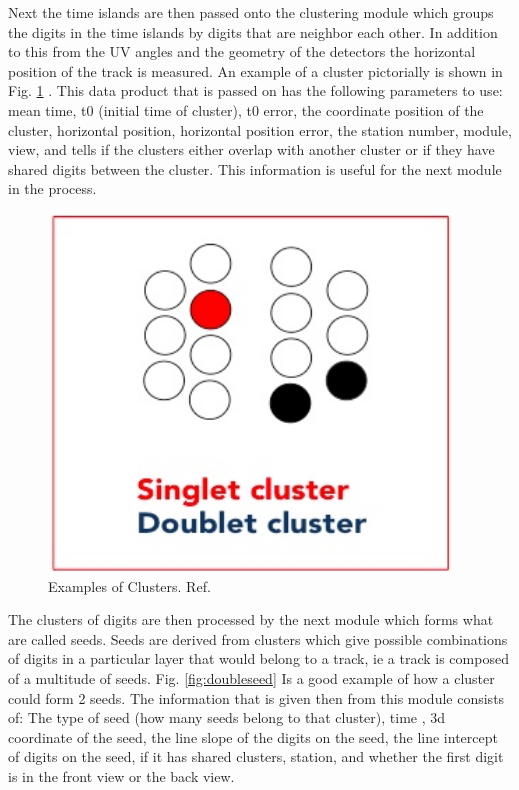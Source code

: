 \documentclass[./Thesis]{subfiles}
\begin{document}
	Next the time islands are then passed onto the clustering module which groups the digits in the time islands by digits that are neighbor each other. In addition to this from the UV angles and the geometry of the detectors the horizontal position of the track is measured. An example of a cluster pictorially is shown in Fig. \ref{fig:cluster} .  This data product that is passed on has the following parameters to use: mean time, t0 (initial time of cluster), t0 error, the coordinate position of the cluster, horizontal position, horizontal position error, the station number, module, view, and tells if the clusters either overlap with another cluster or if they have shared digits between the cluster. This information is useful for the next module in the process.
	
\begin{figure}
	\centerline{\includegraphics[height=95mm]{Clusters.jpeg}}
	\caption[Cluster Example]{ Examples of Clusters.  Ref. \cite{trackerWiki}
	}
	\label{fig:cluster}
\end{figure} 
	
	
	
	
	The clusters of digits are then processed by the next module which forms what are called seeds. Seeds are derived from clusters which give possible combinations of digits in a particular layer that would belong to a track, ie a track is composed of a multitude of seeds. Fig. \ref{fig:doubleseed} Is a good example of how a cluster could form 2 seeds. The information that is given then from this module consists of: The type of seed (how many seeds belong to that cluster), time , 3d coordinate of the seed, the line slope of the digits on the seed, the line intercept of digits on the seed, if it has shared clusters, station, and whether the first digit is in the front view or the back view.
\end{document}
